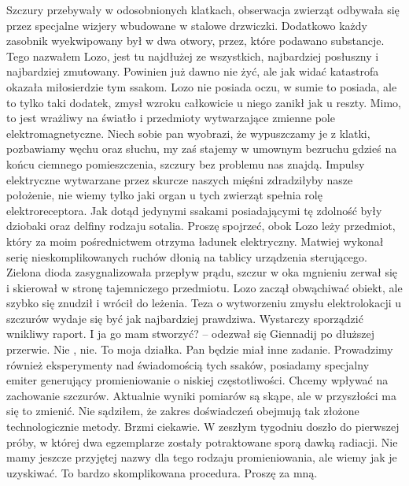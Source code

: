 \documentclass[../MAIN.tex]{subfiles}
\begin{document}
\qd
Szczury przebywały w odosobnionych klatkach, obserwacja zwierząt odbywała się przez specjalne wizjery wbudowane w stalowe drzwiczki. Dodatkowo każdy zasobnik wyekwipowany był w dwa otwory, przez, które podawano substancje. 
% 
\sx Tego nazwałem Lozo, jest tu najdłużej ze wszystkich, najbardziej posłuszny i najbardziej zmutowany. Powinien już dawno nie żyć, ale jak widać katastrofa okazała miłosierdzie tym ssakom. Lozo nie posiada oczu, w sumie to posiada, ale to tylko taki dodatek, zmysł wzroku całkowicie u niego zanikł jak u reszty. Mimo, to jest wrażliwy na światło i przedmioty wytwarzające zmienne pole elektromagnetyczne. Niech sobie pan wyobrazi, że wypuszczamy je z klatki, pozbawiamy węchu oraz słuchu, my zaś stajemy w umownym bezruchu gdzieś na końcu ciemnego pomieszczenia, szczury bez problemu nas znajdą. Impulsy elektryczne wytwarzane przez skurcze naszych mięśni zdradziłyby nasze położenie, nie wiemy tylko jaki organ u tych zwierząt spełnia rolę elektroreceptora. Jak dotąd jedynymi ssakami posiadającymi tę zdolność były dziobaki oraz delfiny rodzaju sotalia. Proszę spojrzeć, obok Lozo leży przedmiot, który za moim pośrednictwem otrzyma ładunek elektryczny.
\qd
Matwiej wykonał serię nieskomplikowanych ruchów dłonią na tablicy urządzenia sterującego. Zielona dioda zasygnalizowała przepływ prądu, szczur w oka mgnieniu zerwał się i skierował w stronę tajemniczego przedmiotu. Lozo zaczął obwąchiwać obiekt, ale szybko się znudził i wrócił do leżenia. 
% 
\sx Teza o wytworzeniu zmysłu elektrolokacji u szczurów wydaje się być jak najbardziej prawdziwa. Wystarczy sporządzić wnikliwy raport. 
\xx I ja go mam stworzyć? -- odezwał się Giennadij po dłuższej przerwie. 
\xx Nie , nie. To moja działka. Pan będzie miał inne zadanie. Prowadzimy również eksperymenty nad świadomością tych ssaków, posiadamy specjalny emiter generujący promieniowanie o niskiej częstotliwości. Chcemy wpływać na zachowanie szczurów. Aktualnie wyniki pomiarów są skąpe, ale w przyszłości ma się to zmienić. 
\xx Nie sądziłem, że zakres doświadczeń obejmują tak złożone technologicznie metody. Brzmi ciekawie. 
\xx W zeszłym tygodniu doszło do pierwszej próby, w której dwa egzemplarze zostały potraktowane sporą dawką radiacji. Nie mamy jeszcze przyjętej nazwy dla tego rodzaju promieniowania, ale wiemy jak je uzyskiwać. To bardzo skomplikowana procedura. Proszę za mną. 
\qd
\end{document}
